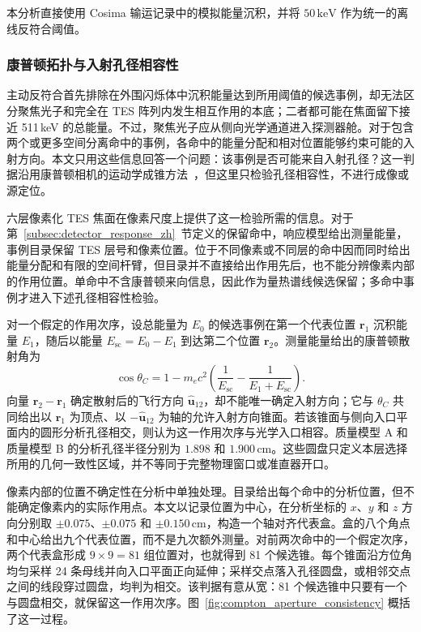 \documentclass[11pt]{article}
\newcommand{\keV}{\,\mathrm{keV}}
\begin{document}
本分析直接使用 Cosima 输运记录中的模拟能量沉积，并将 $50\keV$ 作为统一的离线反符合阈值。

\subsubsection{康普顿拓扑与入射孔径相容性}

主动反符合首先排除在外围闪烁体中沉积能量达到所用阈值的候选事例，却无法区分聚焦光子和完全在 TES 阵列内发生相互作用的本底；二者都可能在焦面留下接近 511\,keV 的总能量。不过，聚焦光子应从侧向光学通道进入探测器舱。对于包含两个或更多空间分离命中的事例，各命中的能量分配和相对位置能够约束可能的入射方向。本文只用这些信息回答一个问题：该事例是否可能来自入射孔径？这一判据沿用康普顿相机的运动学成锥方法~\cite{Zoglauer2006}，但这里只检验孔径相容性，不进行成像或源定位。

六层像素化 TES 焦面在像素尺度上提供了这一检验所需的信息。对于第~\ref{subsec:detector_response_zh}~节定义的保留命中，响应模型给出测量能量，事例目录保留 TES 层号和像素位置。位于不同像素或不同层的命中因而同时给出能量分配和有限的空间杆臂，但目录并不直接给出作用先后，也不能分辨像素内部的作用位置。单命中不含康普顿来向信息，因此作为量热谱线候选保留；多命中事例才进入下述孔径相容性检验。

对一个假定的作用次序，设总能量为 $E_0$ 的候选事例在第一个代表位置 $\mathbf r_1$ 沉积能量 $E_1$，随后以能量 $E_{\mathrm{sc}}=E_0-E_1$ 到达第二个位置 $\mathbf r_2$。测量能量给出的康普顿散射角为
\begin{equation}
  \cos\theta_C =
  1 - m_ec^2\left(\frac{1}{E_{\mathrm{sc}}}
  - \frac{1}{E_1+E_{\mathrm{sc}}}\right).
\end{equation}
向量 $\mathbf r_2-\mathbf r_1$ 确定散射后的飞行方向 $\hat{\mathbf u}_{12}$，却不能唯一确定入射方向；它与 $\theta_C$ 共同给出以 $\mathbf r_1$ 为顶点、以 $-\hat{\mathbf u}_{12}$ 为轴的允许入射方向锥面。若该锥面与侧向入口平面内的圆形分析孔径相交，则认为这一作用次序与光学入口相容。质量模型 A 和质量模型 B 的分析孔径半径分别为 $1.898$ 和 $1.900\,\mathrm{cm}$。这些圆盘只定义本层选择所用的几何一致性区域，并不等同于完整物理窗口或准直器开口。

像素内部的位置不确定性在分析中单独处理。目录给出每个命中的分析位置，但不能确定像素内的实际作用点。本文以记录位置为中心，在分析坐标的 $x$、$y$ 和 $z$ 方向分别取 $\pm0.075$、$\pm0.075$ 和 $\pm0.150\,\mathrm{cm}$，构造一个轴对齐代表盒。盒的八个角点和中心给出九个代表位置，而不是九次额外测量。对前两次命中的一个假定次序，两个代表盒形成 $9\times9=81$ 组位置对，也就得到 81 个候选锥。每个锥面沿方位角均匀采样 24 条母线并向入口平面正向延伸；采样交点落入孔径圆盘，或相邻交点之间的线段穿过圆盘，均判为相交。该判据有意从宽：81 个候选锥中只要有一个与圆盘相交，就保留这一作用次序。图~\ref{fig:compton_aperture_consistency} 概括了这一过程。
\end{document}
